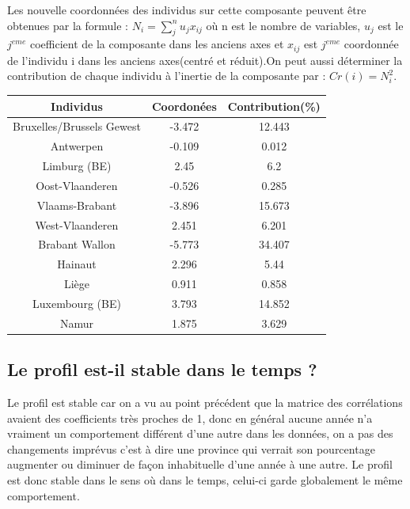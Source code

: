 \documentclass{article}
\begin{document}
Les nouvelle coordonnées des individus sur cette composante peuvent être obtenues par la formule : $N_i=\sum_j^n u_j x_{ij}$ où n est le nombre de variables, $u_j$ est le $j^{eme}$ coefficient de la composante dans les anciens axes et $x_{ij}$ est $j^{eme}$ coordonnée de l'individu i dans les anciens axes(centré et réduit).On peut aussi déterminer la contribution de chaque individu à l'inertie de la composante par : $Cr(i)=N_i^2$.
\begin{table}[h]
\centering 
\begin{tabular}{|c|c|c|} 
  \hline
  Individus & Coordonées & Contribution(\%)\\
  \hline
  Bruxelles/Brussels Gewest & -3.472 & 12.443\\
  \hline  
  Antwerpen         &   -0.109    &    0.012\\
  \hline  
  Limburg (BE)       &     2.45   &   6.2\\
  \hline  
  Oost-Vlaanderen     &  -0.526   &    0.285\\
  \hline  
  Vlaams-Brabant       &  -3.896 &    15.673\\
  \hline  
  West-Vlaanderen     &   2.451  &     6.201\\
  \hline  
  Brabant Wallon     &   -5.773 &     34.407\\
  \hline
  Hainaut             &  2.296 &      5.44\\
  \hline  
  Liège              &  0.911  &     0.858\\
  \hline  
  Luxembourg (BE)     & 3.793 &      14.852\\
  \hline
  Namur              & 1.875   &      3.629\\
  \hline
\end{tabular}
\end{table}

 \newpage
\subsection{Le profil est-il stable dans le temps ?}

Le profil est stable car on a vu au point précédent que la matrice des corrélations avaient des coefficients très proches de 1, donc en général aucune année n'a vraiment un comportement différent d'une autre dans les données, on a pas des changements imprévus c'est à dire une province qui verrait son pourcentage augmenter ou diminuer de façon inhabituelle d'une année à une autre. Le profil est donc stable dans le sens où dans le temps, celui-ci garde globalement le même comportement. 
\end{document}
